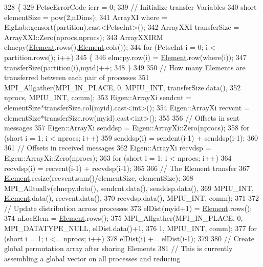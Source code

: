 \begin{DoxyCode}
328 \{
329   PetscErrorCode ierr = 0;
339   \textcolor{comment}{// Initialize transfer Variables}
340   \textcolor{keywordtype}{short} elementSize = pow(2,nDims);
341   ArrayXI where = EigLab::gensort(partition).cast<PetscInt>();
342   ArrayXXI transferSize = ArrayXXI::Zero(nprocs,nprocs);
343   ArrayXXIRM elmcpy(\mbox{\hyperlink{class_element}{Element}}.rows(),\mbox{\hyperlink{class_element}{Element}}.cols());
344   \textcolor{keywordflow}{for} (PetscInt i = 0; i < partition.rows(); i++)
345   \{
346     elmcpy.row(i) = \mbox{\hyperlink{class_element}{Element}}.row(where(i));
347     transferSize(partition(i),myid)++;
348   \}
349 
350   \textcolor{comment}{// How many Elements are transferred between each pair of processes}
351   MPI\_Allgather(MPI\_IN\_PLACE, 0, MPIU\_INT, transferSize.data(),
352                 nprocs, MPIU\_INT, comm);
353   Eigen::ArrayXi sendcnt = elementSize*transferSize.col(myid).cast<\textcolor{keywordtype}{int}>();
354   Eigen::ArrayXi recvcnt = elementSize*transferSize.row(myid).cast<\textcolor{keywordtype}{int}>();
355 
356   \textcolor{comment}{// Offsets in sent messages}
357   Eigen::ArrayXi senddsp = Eigen::ArrayXi::Zero(nprocs);
358   \textcolor{keywordflow}{for} (\textcolor{keywordtype}{short} i = 1; i < nprocs; i++)
359     senddsp(i) = sendcnt(i-1) + senddsp(i-1);
360 
361   \textcolor{comment}{// Offsets in received messages}
362   Eigen::ArrayXi recvdsp = Eigen::ArrayXi::Zero(nprocs);
363   \textcolor{keywordflow}{for} (\textcolor{keywordtype}{short} i = 1; i < nprocs; i++)
364     recvdsp(i) = recvcnt(i-1) + recvdsp(i-1);
365 
366   \textcolor{comment}{// The Element transfer}
367   \mbox{\hyperlink{class_element}{Element}}.resize(recvcnt.sum()/elementSize, elementSize);
368   MPI\_Alltoallv(elmcpy.data(), sendcnt.data(), senddsp.data(),
369                 MPIU\_INT, \mbox{\hyperlink{class_element}{Element}}.data(), recvcnt.data(),
370                 recvdsp.data(), MPIU\_INT, comm);
371 
372   \textcolor{comment}{// Update distribution across processes}
373   elDist(myid+1) = \mbox{\hyperlink{class_element}{Element}}.rows();
374   nLocElem = \mbox{\hyperlink{class_element}{Element}}.rows();
375   MPI\_Allgather(MPI\_IN\_PLACE, 0, MPI\_DATATYPE\_NULL, elDist.data()+1,
376                 1, MPIU\_INT, comm);
377   \textcolor{keywordflow}{for} (\textcolor{keywordtype}{short} i = 1; i <= nprocs; i++)
378     elDist(i) += elDist(i-1);
379 
380   \textcolor{comment}{// Create global permutation array after sharing Elements}
381   \textcolor{comment}{// This is currently assembling a global vector on all processes and reducing}

\end{DoxyCode}
